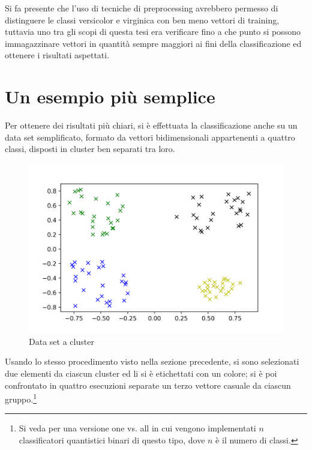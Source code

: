 Si fa presente che l'uso di tecniche di preprocessing avrebbero permesso di 
distinguere le classi versicolor e virginica con ben meno vettori di training, 
tuttavia uno tra gli scopi di questa tesi era verificare fino a che punto si possono 
immagazzinare vettori in quantità sempre maggiori ai fini della classificazione 
ed ottenere i risultati aspettati. 

\section{Un esempio più semplice}

Per ottenere dei risultati più chiari, si è effettuata la classificazione 
anche su un data set semplificato, formato da vettori bidimensionali 
appartenenti a quattro classi, disposti in cluster ben separati tra loro. 

\begin{figure}[h!]
    \centering
    \includegraphics[width=\textwidth]{gfx/cluster/cluster}
    \caption{Data set a cluster}
    \label{fig:cluster}
\end{figure}

Usando lo stesso procedimento visto nella sezione precedente, si sono 
selezionati due elementi da ciascun cluster ed li si è etichettati con un colore; 
si è poi confrontato in quattro esecuzioni separate un terzo vettore 
casuale da ciascun gruppo.\footnote{Si veda \cite{anagolum} per una versione 
one vs. all in cui vengono implementati $n$ classificatori quantistici binari di questo tipo, 
dove $n$ è il numero di classi.}


